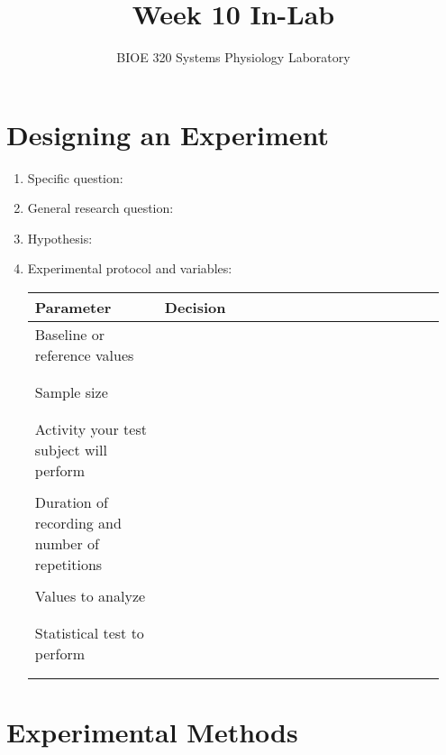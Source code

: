 \documentclass{article}
\title{Week 10 In-Lab}
\author{BIOE 320 Systems Physiology Laboratory}
\date{}
\begin{document}
\large
\maketitle

\section*{Designing an Experiment}

\begin{enumerate}
	\item Specific question:\vspace{2cm}
	\item General research question:\vspace{2cm}
	\item Hypothesis:\vspace{2cm}
	\item Experimental protocol and variables:
	
	\begin{table}[h]
	\centering
	\begin{tabular}[h!]{p{0.3\linewidth}|p{0.65\linewidth}}
	\toprule
	Parameter & Decision\\
	\midrule
	Baseline or reference values & \\\\\\\midrule
	Sample size & \\\\\\\midrule
	Activity your test subject will perform & \\\\\midrule
	Duration of recording and number of repetitions & \\\\\midrule
	Values to analyze & \\\\\\\midrule
	Statistical test to perform & \\\\\\
	\bottomrule
	\end{tabular}
	\end{table}\vspace{3cm}
	
\end{enumerate}


\section*{Experimental Methods}
\end{document}

